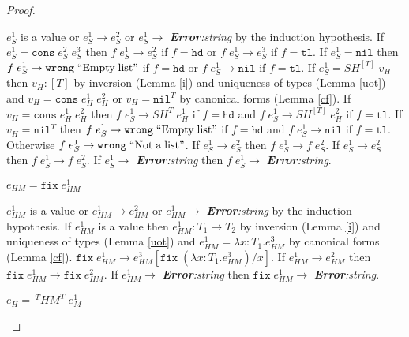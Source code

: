 \begin{theorem}
\begin{proof}
\begin{case}
$e_{S}^{1}$ is a value or $e_{S}^{1}\rightarrow e_{S}^{2}$ or $e_{S}^{1}\rightarrow$ \emph{\textbf{Error}:\;string} by the induction hypothesis.  If $e_{S}^{1}=\mathtt{cons}\;e_{S}^{2}\;e_{S}^{3}$ then $f\;e_{S}^{1}\rightarrow e_{S}^{2}$ if $f=\mathtt{hd}$ or $f\;e_{S}^{1}\rightarrow e_{S}^{3}$ if $f=\mathtt{tl}$.  If $e_{S}^{1}=\mathtt{nil}$ then $f\;e_{S}^{1}\rightarrow\mathtt{wrong}\;\mathrm{``Empty\;list"}$ if $f=\mathtt{hd}$ or $f\;e_{S}^{1}\rightarrow\mathtt{nil}$ if $f=\mathtt{tl}$.  If $e_{S}^{1}=SH^{[T]}\;v_{H}$ then $v_{H}:[T]$ by inversion (Lemma \ref{i}) and uniqueness of types (Lemma \ref{uot}) and $v_{H}=\mathtt{cons}\;e_{H}^{1}\;e_{H}^{2}$ or $v_{H}=\mathtt{nil}^{T}$ by canonical forms (Lemma \ref{cf}).  If $v_{H}=\mathtt{cons}\;e_{H}^{1}\;e_{H}^{2}$ then $f\;e_{S}^{1}\rightarrow SH^{T}\;e_{H}^{1}$ if $f=\mathtt{hd}$ and $f\;e_{S}^{1}\rightarrow SH^{[T]}\;e_{H}^{2}$ if $f=\mathtt{tl}$.  If $v_{H}=\mathtt{nil}^{T}$ then $f\;e_{S}^{1}\rightarrow\mathtt{wrong}\;\mathrm{``Empty\;list"}$ if $f=\mathtt{hd}$ and $f\;e_{S}^{1}\rightarrow\mathtt{nil}$ if $f=\mathtt{tl}$.  Otherwise $f\;e_{S}^{1}\rightarrow\mathtt{wrong}\;\mathrm{``Not\;a\;list"}$.  If $e_{S}^{1}\rightarrow e_{S}^{2}$ then $f\;e_{S}^{1}\rightarrow f\;e_{S}^{2}$.  If $e_{S}^{1}\rightarrow e_{S}^{2}$ then $f\;e_{S}^{1}\rightarrow f\;e_{S}^{2}$.  If $e_{S}^{1}\rightarrow$ \emph{\textbf{Error}:\;string} then $f\;e_{S}^{1}\rightarrow$ \emph{\textbf{Error}:\;string}.
\end{case}
\begin{case}
$e_{HM}=\mathtt{fix}\;e_{HM}^{1}$

$e_{HM}^{1}$ is a value or $e_{HM}^{1}\rightarrow e_{HM}^{2}$ or $e_{HM}^{1}\rightarrow$ \emph{\textbf{Error}:\;string} by the induction hypothesis.  If $e_{HM}^{1}$ is a value then $e_{HM}^{1}:T_{1}\rightarrow T_{2}$ by inversion (Lemma \ref{i}) and uniqueness of types (Lemma \ref{uot}) and $e_{HM}^{1}=\lambda x:T_{1}.e_{HM}^{3}$ by canonical forms (Lemma \ref{cf}).  $\mathtt{fix}\;e_{HM}^{1}\rightarrow e_{HM}^{3}[\mathtt{fix}\;(\lambda x:T_{1}.e_{HM}^{3})/x]$.  If $e_{HM}^{1}\rightarrow e_{HM}^{2}$ then $\mathtt{fix}\;e_{HM}^{1}\rightarrow\mathtt{fix}\;e_{HM}^{2}$.  If $e_{HM}^{1}\rightarrow$ \emph{\textbf{Error}:\;string} then $\mathtt{fix}\;e_{HM}^{1}\rightarrow$ \emph{\textbf{Error}:\;string}.
\end{case}
\begin{case}
$e_{H}=\,^{T}HM^{T}\;e_{M}^{1}$


\end{case}
\end{proof}
\end{theorem}
